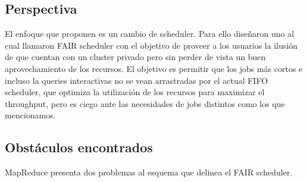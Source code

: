\subsection{Perspectiva}
El enfoque que proponen es un cambio de scheduler. Para ello diseñaron uno
al cual llamaron FAIR scheduler con el objetivo de proveer a los usuarios la ilusión
de que cuentan con un cluster privado pero sin perder de vista un
buen aprovechamiento de los recursos. El objetivo es permitir que los
jobs más cortos e incluso la queries interactivas no se vean arrastradas
por el actual FIFO scheduler, que optimiza la utilización de los recursos
para maximizar el throughput, pero es ciego ante las necesidades de jobs
distintos como los que mencionamos.

\subsection{Obstáculos encontrados}
MapReduce presenta dos problemas al esquema que delinea el FAIR scheduler.

